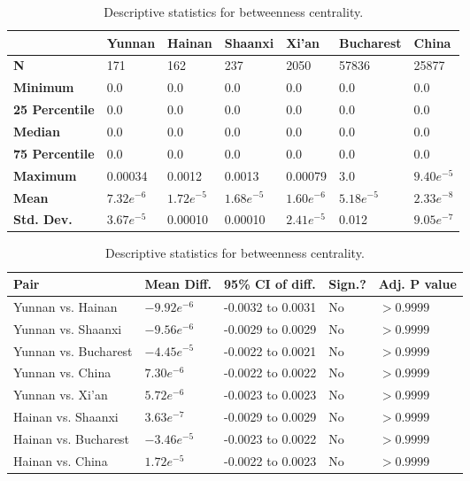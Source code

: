 \begin{table}[h]
	\begin{mdframed}
		\begin{tabular*}{\linewidth}{l|llllll}
			\hline
			\textbf{ } & \textbf{Yunnan} & \textbf{Hainan} & \textbf{Shaanxi} & \textbf{Xi'an} & \textbf{Bucharest} & \textbf{China}\\
			\hline
			\textbf{N} & 171 & 162 & 237 & 2050 & 57836 & 25877\\
			\textbf{Minimum} & 0.0 & 0.0 & 0.0 & 0.0 & 0.0 & 0.0\\
			\textbf{25 Percentile} & 0.0 & 0.0 & 0.0 & 0.0 & 0.0 & 0.0\\
			\textbf{Median} & 0.0 & 0.0 & 0.0 & 0.0 & 0.0 & 0.0\\
			\textbf{75 Percentile} & 0.0 & 0.0 & 0.0 & 0.0 & 0.0 & 0.0\\
			\textbf{Maximum} & 0.00034 & 0.0012 & 0.0013 & 0.00079 & 3.0 & $9.40e^{-5}$\\
			\textbf{Mean} & $7.32e^{-6}$ & $1.72e^{-5}$ & $1.68e^{-5}$ & $1.60e^{-6}$ & $5.18e^{-5}$ & $2.33e^{-8}$\\
			\textbf{Std. Dev.} & $3.67e^{-5}$ & 0.00010 & 0.00010 & $2.41e^{-5}$ & 0.012 & $9.05e^{-7}$\\
			\hline
		\end{tabular*}
		\caption{Descriptive statistics for betweenness centrality.}
		\label{tab:betweenness_centrality_desc}
		\vskip 10pt
		\small
		\begin{tabular*}{\linewidth}{l|llll}
			\hline
			\textbf{Pair} & \textbf{Mean Diff.} & \textbf{95\% CI of diff.} & \textbf{Sign.?} & \textbf{Adj. P value}\\
			\hline
			Yunnan vs. Hainan & $-9.92e^{-6}$ & -0.0032 to 0.0031 & No & $>0.9999$\\
			Yunnan vs. Shaanxi & $-9.56e^{-6}$ & -0.0029 to 0.0029 & No & $>0.9999$\\
			Yunnan vs. Bucharest & $-4.45e^{-5}$ & -0.0022 to 0.0021 & No & $>0.9999$\\
			Yunnan vs. China & $7.30e^{-6}$ & -0.0022 to 0.0022 & No & $>0.9999$\\
			Yunnan vs. Xi'an & $5.72e^{-6}$ & -0.0023 to 0.0023 & No & $>0.9999$\\
			Hainan vs. Shaanxi & $3.63e^{-7}$ & -0.0029 to 0.0029 & No & $>0.9999$\\
			Hainan vs. Bucharest & $-3.46e^{-5}$ & -0.0023 to 0.0022 & No & $>0.9999$\\
			Hainan vs. China & $1.72e^{-5}$ & -0.0022 to 0.0023 & No & $>0.9999$\\

\end{tabular*}
\end{mdframed}
\end{table}
